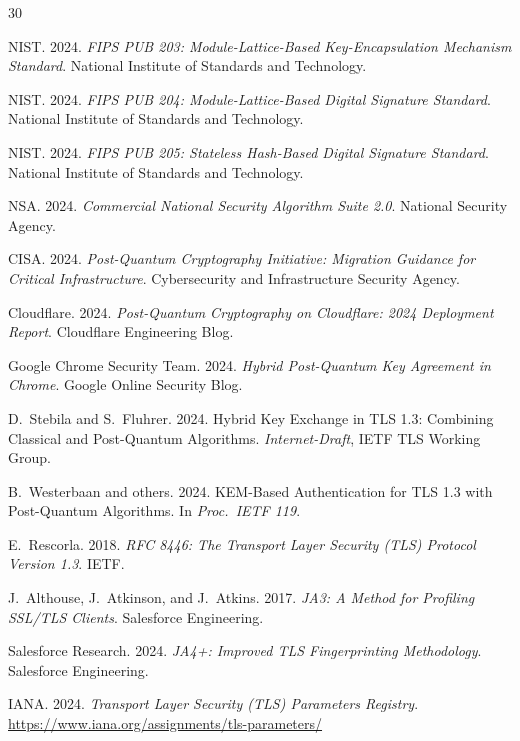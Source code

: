 \documentclass[sigconf,nonacm]{acmart}
\begin{document}
\sloppy

\begin{thebibliography}{30}

NIST. 2024. \textit{FIPS PUB 203: Module-Lattice-Based Key-Encapsulation
Mechanism Standard}. National Institute of Standards and Technology.

NIST. 2024. \textit{FIPS PUB 204: Module-Lattice-Based Digital
Signature Standard}. National Institute of Standards and Technology.

NIST. 2024. \textit{FIPS PUB 205: Stateless Hash-Based Digital
Signature Standard}. National Institute of Standards and Technology.

NSA. 2024. \textit{Commercial National Security Algorithm Suite 2.0}.
National Security Agency.

CISA. 2024. \textit{Post-Quantum Cryptography Initiative: Migration
Guidance for Critical Infrastructure}. Cybersecurity and Infrastructure
Security Agency.

Cloudflare. 2024. \textit{Post-Quantum Cryptography on Cloudflare:
2024 Deployment Report}. Cloudflare Engineering Blog.

Google Chrome Security Team. 2024. \textit{Hybrid Post-Quantum Key
Agreement in Chrome}. Google Online Security Blog.

D.~Stebila and S.~Fluhrer. 2024. Hybrid Key Exchange in TLS 1.3:
Combining Classical and Post-Quantum Algorithms. \textit{Internet-Draft},
IETF TLS Working Group.

B.~Westerbaan and others. 2024. KEM-Based Authentication for TLS 1.3
with Post-Quantum Algorithms. In \textit{Proc.\ IETF 119}.

E.~Rescorla. 2018. \textit{RFC 8446: The Transport Layer Security
(TLS) Protocol Version 1.3}. IETF.

J.~Althouse, J.~Atkinson, and J.~Atkins. 2017. \textit{JA3: A Method
for Profiling SSL/TLS Clients}. Salesforce Engineering.

Salesforce Research. 2024. \textit{JA4+: Improved TLS Fingerprinting
Methodology}. Salesforce Engineering.

IANA. 2024. \textit{Transport Layer Security (TLS) Parameters
Registry}. \url{https://www.iana.org/assignments/tls-parameters/}


\end{thebibliography}
\end{document}

